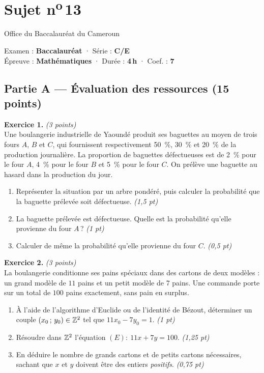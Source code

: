 \section{Sujet n\textsuperscript{o}\,13}
\noindent\begin{minipage}{0.5\linewidth}\footnotesize Office du Baccalauréat du Cameroun\end{minipage}%
\hfill\begin{minipage}{0.45\linewidth}\footnotesize\raggedleft Examen : \textbf{Baccalauréat} · Série : \textbf{C/E}\\
Épreuve : \textbf{Mathématiques} · Durée : \textbf{4\,h} · Coef. : \textbf{7}\end{minipage}
\par\smallskip{\color{onbo}\rule{\linewidth}{1pt}}

\subsection*{Partie A — Évaluation des ressources \hfill (15 points)}

\noindent\textbf{Exercice 1.} \hfill\textit{(3 points)}\\
Une boulangerie industrielle de Yaoundé produit ses baguettes au moyen de trois fours
$A$, $B$ et $C$, qui fournissent respectivement \SI{50}{\percent}, \SI{30}{\percent} et
\SI{20}{\percent} de la production journalière. La proportion de baguettes défectueuses
est de \SI{2}{\percent} pour le four $A$, \SI{4}{\percent} pour le four $B$ et
\SI{5}{\percent} pour le four $C$. On prélève une baguette au hasard dans la production
du jour.
\begin{enumerate}[label=\arabic*)]
\item Représenter la situation par un arbre pondéré, puis calculer la probabilité que la
baguette prélevée soit défectueuse. \hfill\textit{(1,5 pt)}
\item La baguette prélevée est défectueuse. Quelle est la probabilité qu'elle provienne du four $A$\,? \hfill\textit{(1 pt)}
\item Calculer de même la probabilité qu'elle provienne du four $C$. \hfill\textit{(0,5 pt)}
\end{enumerate}

\smallskip
\noindent\textbf{Exercice 2.} \hfill\textit{(3 points)}\\
La boulangerie conditionne ses pains spéciaux dans des cartons de deux modèles : un
grand modèle de $11$ pains et un petit modèle de $7$ pains. Une commande porte sur un
total de $100$ pains exactement, sans pain en surplus.
\begin{enumerate}[label=\arabic*)]
\item À l'aide de l'algorithme d'Euclide ou de l'identité de Bézout, déterminer un couple
$(x_0\,;\,y_0)\in\mathbb{Z}^2$ tel que $11x_0-7y_0=1$. \hfill\textit{(1 pt)}
\item Résoudre dans $\mathbb{Z}^2$ l'équation $(E):\ 11x+7y=100$. \hfill\textit{(1,25 pt)}
\item En déduire le nombre de grands cartons et de petits cartons nécessaires, sachant que
$x$ et $y$ doivent être des entiers \emph{positifs}. \hfill\textit{(0,75 pt)}
\end{enumerate}

